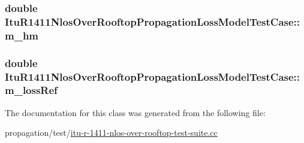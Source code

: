 \subsubsection[{\texorpdfstring{m\+\_\+hm}{m_hm}}]{\setlength{\rightskip}{0pt plus 5cm}double Itu\+R1411\+Nlos\+Over\+Rooftop\+Propagation\+Loss\+Model\+Test\+Case\+::m\+\_\+hm\hspace{0.3cm}{\ttfamily [private]}}\hypertarget{classItuR1411NlosOverRooftopPropagationLossModelTestCase_ac5f633470ec30d5f552bfd6ee8a9f9e8}{}\label{classItuR1411NlosOverRooftopPropagationLossModelTestCase_ac5f633470ec30d5f552bfd6ee8a9f9e8}
\subsubsection[{\texorpdfstring{m\+\_\+loss\+Ref}{m_lossRef}}]{\setlength{\rightskip}{0pt plus 5cm}double Itu\+R1411\+Nlos\+Over\+Rooftop\+Propagation\+Loss\+Model\+Test\+Case\+::m\+\_\+loss\+Ref\hspace{0.3cm}{\ttfamily [private]}}\hypertarget{classItuR1411NlosOverRooftopPropagationLossModelTestCase_a559ade0fb976f4446df2182724ce8d94}{}\label{classItuR1411NlosOverRooftopPropagationLossModelTestCase_a559ade0fb976f4446df2182724ce8d94}


The documentation for this class was generated from the following file\+:\begin{DoxyCompactItemize}
\item 
propagation/test/\hyperlink{itu-r-1411-nlos-over-rooftop-test-suite_8cc}{itu-\/r-\/1411-\/nlos-\/over-\/rooftop-\/test-\/suite.\+cc}\end{DoxyCompactItemize}

